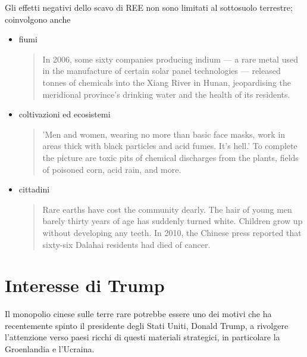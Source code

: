 \documentclass[12pt,a4paper,oneside]{book}
\begin{document}
Gli effetti negativi dello scavo di REE non sono limitati al sottosuolo terrestre; coinvolgono anche

\begin{itemize}
\item fiumi
\begin{quote}
\small
In 2006, some sixty companies producing indium — a rare metal used in the manufacture of certain solar panel technologies — released tonnes of chemicals into the Xiang River in Hunan, jeopardising the meridional province’s drinking water and the health of its residents. \citep[p. 25]{pitron2020rare}
\end{quote}

\item coltivazioni ed ecosistemi
\begin{quote}
\small
'Men and women, wearing no more than basic face masks, work in areas thick with black particles and acid fumes. It’s hell.' To complete the picture are toxic pits of chemical discharges from the plants, fields of poisoned corn, acid rain, and more. \citep[p. 26]{pitron2020rare}
\end{quote}

\item cittadini
\begin{quote}
\small
Rare earths have cost the community dearly. The hair of young men barely thirty years of age has suddenly turned white. Children grow up without developing any teeth. In 2010, the Chinese press reported that sixty-six Dalahai residents had died of cancer. \citep[p. 29]{pitron2020rare}
\end{quote}
    
\end{itemize}

\section{Interesse di Trump}
Il monopolio cinese sulle terre rare potrebbe essere uno dei motivi che ha recentemente spinto il presidente degli Stati Uniti, Donald Trump, a rivolgere l'attenzione verso paesi ricchi di questi materiali strategici, in particolare la Groenlandia e l'Ucraina.
\end{document}
